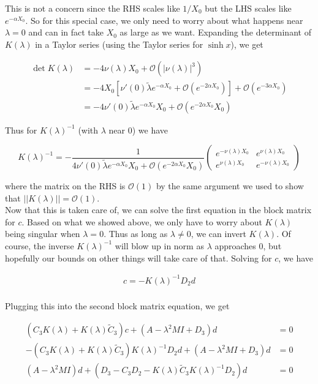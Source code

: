\documentclass[12pt]{article}
\begin{document}
This is not a concern since the RHS scales like $1/X_0$ but the LHS scales like $e^{-\alpha X_0}$. So for this special case, we only need to worry about what happens near $\lambda = 0$ and can in fact take $X_0$ as large as we want. Expanding the determinant of $K(\lambda)$ in a Taylor series (using the Taylor series for $\sinh x$), we get

\begin{align*}
\det K(\lambda) &= -4 \nu(\lambda) X_0 + \mathcal{O}(|\nu(\lambda)|^3) \\
&= -4 X_0 [ \nu'(0)\tilde{\lambda}e^{-\alpha X_0} + \mathcal{O}(e^{-2 \alpha X_0}) ] + \mathcal{O}(e^{-3 \alpha X_0}) \\
&= -4 \nu'(0)\tilde{\lambda}e^{-\alpha X_0}X_0 + \mathcal{O}(e^{-2 \alpha X_0}X_0) 
\end{align*}

Thus for $K(\lambda)^{-1}$ (with $\lambda$ near 0) we have

\begin{equation}
K(\lambda)^{-1} = 
-\frac{1}{4 \nu'(0)\tilde{\lambda}e^{-\alpha X_0}X_0 + \mathcal{O}(e^{-2 \alpha X_0}X_0)}
\begin{pmatrix}
e^{-\nu(\lambda)X_0} & e^{\nu(\lambda)X_0} \\
e^{\nu(\lambda)X_0} & e^{-\nu(\lambda)X_0}
\end{pmatrix}
\end{equation}

where the matrix on the RHS is $\mathcal{O}(1)$ by the same argument we used to show that $||K(\lambda)|| = \mathcal{O}(1)$.\\

Now that this is taken care of, we can solve the first equation in the block matrix for $c$. Based on what we showed above, we only have to worry about $K(\lambda)$ being singular when $\lambda = 0$. Thus as long as $\lambda \neq 0$, we can invert $K(\lambda)$. Of course, the inverse $K(\lambda)^{-1}$ will blow up in norm as $\lambda$ approaches 0, but hopefully our bounds on other things will take care of that. Solving for $c$, we have

\begin{align*}
c = -K(\lambda)^{-1} D_2 d \\
\end{align*}

Plugging this into the second block matrix equation, we get

\begin{align*}
(C_3 K(\lambda) + K(\lambda) \tilde{C}_3) c + (A - \lambda^2 MI + D_3)d &= 0 \\
-(C_3 K(\lambda) + K(\lambda) \tilde{C}_3)K(\lambda)^{-1} D_2 d + (A - \lambda^2 MI + D_3)d &= 0 \\
(A - \lambda^2 MI )d + (D_3 - C_3 D_2 - K(\lambda) \tilde{C}_3 K(\lambda)^{-1} D_2) d &= 0 \\
\end{align*}
\end{document}
